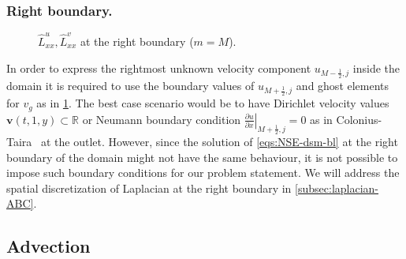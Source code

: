 \documentclass{article}
\numberwithin{equation}{section}
\begin{document}
\subsubsection{Right boundary.}\label{subsubsec:laplacian-right}
\begin{figure}[H] %
  \caption{$\hat{L}^u_{xx},\hat{L}^v_{xx}$ at the right boundary ($m=M$).}\label{fig:luxx-right-first}
\end{figure}
In order to express the rightmost unknown velocity component $u_{M-\frac{1}{2},j}$ inside the domain it is required to use the boundary values of $u_{M+\frac{1}{2},j}$ and ghost elements for $v_g$ as in \cref{fig:luxx-right-first}. The best case scenario would be to have Dirichlet velocity values $\boldsymbol{v}(t,1,y)\subset \mathbb{R}$ or Neumann boundary condition $\left.\frac{\partial u}{\partial x}\right|_{M+\frac{1}{2},j}=0$ as in Colonius-Taira~\cite{Colonius:2008} at the outlet. However, since the solution of \cref{eqs:NSE-dsm-bl} at the right boundary of the domain might not have the same behaviour, it is not possible to impose such boundary conditions for our problem statement. We will address the spatial discretization of Laplacian at the right boundary in \cref{subsec:laplacian-ABC}.

\subsection{Advection}\label{subsec:advection}
\end{document}
